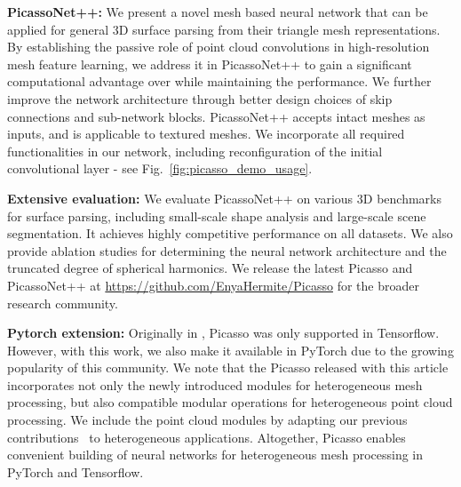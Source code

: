 \begin{itemize}
{\vspace{0.5mm}
\item \textbf{PicassoNet++:} We present a novel mesh based neural network that can be applied for general 3D surface parsing from their triangle mesh representations. By establishing the passive role of point cloud convolutions in high-resolution mesh feature learning, we address it in PicassoNet++ to gain a significant computational advantage over \cite{lei2021picasso} while maintaining the performance. We further improve the network architecture through better design choices of skip connections and sub-network blocks. PicassoNet++ accepts intact meshes as inputs, and is applicable to textured meshes.
We incorporate all required functionalities in our network, including reconfiguration of the initial convolutional layer - see Fig.~\ref{fig:picasso_demo_usage}.} 
\vspace{0.5mm}
\item \textbf{Extensive evaluation:} We evaluate PicassoNet++ on various 3D benchmarks for surface parsing, including small-scale shape analysis and large-scale scene segmentation. It achieves highly competitive performance on all datasets. We also provide ablation studies for determining the neural network architecture and the truncated degree of spherical harmonics. We release the latest Picasso and PicassoNet++ at \href{https://github.com/EnyaHermite/Picasso}{https://github.com/EnyaHermite/Picasso} for the broader research community.
\item \textbf{Pytorch extension:} Originally in \cite{lei2021picasso}, Picasso was only supported in Tensorflow. However, with this work, we also make it available in PyTorch due to the growing popularity of this community. We note that the Picasso released with this article incorporates not only the newly introduced modules for heterogeneous mesh processing, but also compatible modular operations for heterogeneous point cloud processing. We include the point cloud modules by adapting our previous contributions~\cite{lei2020spherical,lei2020seggcn} to heterogeneous applications. Altogether, Picasso enables convenient building of neural networks for heterogeneous mesh processing in PyTorch and Tensorflow.
\end{itemize}

